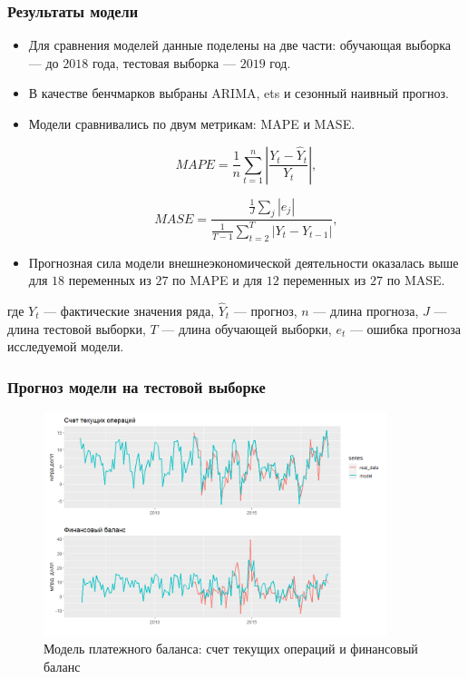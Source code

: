 \documentclass[9pt]{beamer}
\begin{document}
\begin{frame}
	\frametitle{Результаты модели}
	\begin{itemize}
		\item Для сравнения моделей данные поделены на две части: обучающая выборка — до $2018$ года, тестовая выборка — $2019$ год.
		
		\item В качестве бенчмарков выбраны ARIMA, ets и сезонный
		наивный прогноз.
		
		\item Модели сравнивались по двум метрикам: MAPE и MASE.
		
		\footnotesize
		
		\[
		MAPE = \frac{1}{n}\sum_{t=1}^{n}\left|\frac{Y_t - \hat Y_t}{Y_t}\right|,
		\]
		
		\[
		MASE = \frac{\frac{1}{J} \sum_j |e_j|}{\frac{1}{T-1} \sum_{t=2}^T|Y_t - Y_{t-1}|},
		\]
		\normalsize
		
		\item Прогнозная сила модели внешнеэкономической деятельности оказалась выше для $18$ переменных из $27$ по MAPE и для $12$ переменных из $27$ по MASE.
	\end{itemize}

где $Y_t$ — фактические значения ряда, $\hat Y_t$ — прогноз, $n$ — длина прогноза, $J$ — длина тестовой выборки, $T$ — длина обучающей выборки, $e_t$ — ошибка прогноза исследуемой модели.

\end{frame}

\begin{frame}
	\frametitle{Прогноз модели на тестовой выборке}
\begin{figure}[htp!]
\centering
\includegraphics[width=10cm]{cur_fin.png}
\captionsetup{justification=centering,margin=0.5cm}
\caption{Модель платежного баланса: счет текущих операций и финансовый баланс}\label{fi:3}
\captionsetup{margin=0cm}
\end{figure}
\end{frame}
\end{document}
